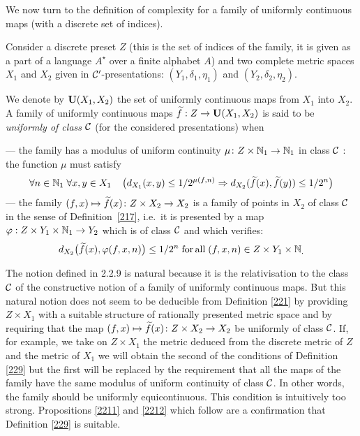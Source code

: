 We now turn to the definition of complexity for a family of uniformly continuous maps (with a discrete set of indices).

\begin{definition} \label{229} 
Consider a discrete preset $Z$ (this is the set of indices of the family, it is given as a part of a language $A^{\star}$ over a finite alphabet $A$) and two complete metric spaces $X_1$ and $X_2$ given in 
${{\cal C}}'$-presentations: $(Y_1,\delta_1,\eta_1)$ and $(Y_2,\delta_2,\eta_2)$.

\noindent 
We denote by ${\bf U}(X_1,X_2)$ the set of uniformly continuous maps from $X_1$ into $X_2$. A family of uniformly continuous maps $\widetilde{f}: Z \to {\bf U}(X_1,X_2)$ is said to be {\em uniformly of class ${{\cal C}}$} (for the considered presentations) when

\noindent 
--- the family has a modulus of uniform continuity $\mu\colon Z \times \mathbb {N}_1 \to\mathbb {N}_1$ in class ${{\cal C}}$ : the function $\mu$ must satisfy 
\[
\forall n \in \mathbb {N}_1\;\forall x,
y \in X_1 \;\; \; \; \big(d_{X_1}(x,y) \leq 1/2^{\mu(f,n)} \Rightarrow 
d_{X_2}(\widetilde{f}(x),\widetilde{f}(y)) \leq 1/2^n \big)
\] 
--- the family $(f,x) \mapsto \widetilde{f}(x)\colon Z \times X_2 \to
X_2$ is a family of points in $X_2$ of class ${{\cal C}}$ in the sense of  Definition~\ref{217}, i.e.\ it is presented by a map $\varphi: Z \times Y_1 \times \mathbb {N}_1 \to Y_2$ which is of class ${{\cal C}}$ and which verifies:
\[
d_{X_2}\big(\widetilde{f}(x),\varphi(f,x,n)\big) \leq 1/2^n \; {\rm for\, all} \; (f, x, n) \in Z \times Y_1 \times \mathbb {N}_.
\]
\end{definition}

\begin{remark} \label{2210}
The notion defined in 2.2.9 is natural because it is the relativisation to the class~${{\cal C}}$ of the constructive notion of a family of uniformly continuous maps. 
But this natural notion does not seem to be deducible from Definition \ref{221} by providing $Z \times X_1$ with a suitable structure of rationally presented metric space and by requiring that the map $(f,x) \mapsto \widetilde{f}(x)\colon Z \times X_2 \to X_2$ be uniformly of class ${{\cal C}}$. If, for example, we take on $Z \times X_1$ the metric deduced from the discrete metric of $Z$ and the metric of $X_1$ we will obtain the second of the conditions of Definition \ref{229} but the first will be replaced by the requirement that all the maps of the family have the same modulus of uniform continuity of class ${{\cal C}}$. In other words, the family should be uniformly equicontinuous. This condition is intuitively too strong.  Propositions \ref{2211} and \ref{2212} which follow are a confirmation that Definition \ref{229} is suitable.
\end{remark}


